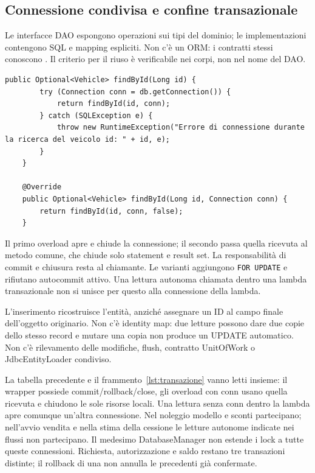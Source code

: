 \subsection{Connessione condivisa e confine transazionale}
Le interfacce DAO espongono operazioni sui tipi del dominio; le
implementazioni  contengono SQL e mapping espliciti.
Non c'è un ORM: i contratti stessi conoscono .
Il criterio per il riuso è verificabile nei corpi, non nel nome del DAO.

\noindent\begin{minipage}{\linewidth}
\begin{lstlisting}[firstnumber=61,caption={\code{PostgresVehicleDao.java}: lettura autonoma e overload con connessione ricevuta.},
  label=lst:dao-connection]
    public Optional<Vehicle> findById(Long id) {
        try (Connection conn = db.getConnection()) {
            return findById(id, conn);
        } catch (SQLException e) {
            throw new RuntimeException("Errore di connessione durante la ricerca del veicolo id: " + id, e);
        }
    }

    @Override
    public Optional<Vehicle> findById(Long id, Connection conn) {
        return findById(id, conn, false);
    }
\end{lstlisting}
\end{minipage}


Il primo overload apre e chiude la connessione; il secondo passa quella
ricevuta al metodo comune, che chiude solo statement e result set.
La responsabilità di commit e chiusura resta al chiamante. Le varianti
 aggiungono \texttt{FOR UPDATE} e rifiutano
autocommit attivo. Una lettura autonoma chiamata dentro una lambda
transazionale non si unisce per questo alla connessione della lambda.

L'inserimento  ricostruisce l'entità, anziché assegnare
un ID al campo finale dell'oggetto originario. Non c'è identity map:
due letture possono dare due copie dello stesso record e mutare una copia
non produce un UPDATE automatico. Non c'è rilevamento delle modifiche,
flush, contratto UnitOfWork o JdbcEntityLoader condiviso.

La tabella precedente e il frammento~\ref{lst:transazione} vanno letti
insieme: il wrapper possiede commit/rollback/close, gli overload con conn
usano quella ricevuta e chiudono le sole risorse locali. Una lettura senza
conn dentro la lambda apre comunque un'altra connessione. Nel noleggio
modello e sconti partecipano; nell'avvio vendita e nella stima della
cessione le letture autonome indicate nei flussi non partecipano.
Il medesimo DatabaseManager non estende i lock a tutte queste connessioni.
Richiesta, autorizzazione e saldo restano tre transazioni distinte; il
rollback di una non annulla le precedenti già confermate.

